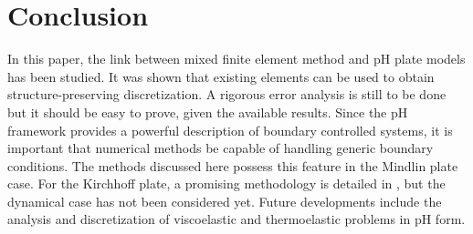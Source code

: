 \section{Conclusion}
In this paper, the link between mixed finite element method and pH plate models has been studied. It was shown that existing elements can be used to obtain structure-preserving discretization. A rigorous error analysis is still to be done but it should be easy to prove, given the available results. Since the pH framework provides a powerful description of boundary controlled systems, it is important that numerical methods be capable of handling generic boundary conditions. The methods discussed here possess this feature in the Mindlin plate case. For the Kirchhoff plate, a promising methodology is detailed in \cite{mixed_kirchhoff}, but the dynamical case has not been considered yet. Future developments include the analysis and discretization of viscoelastic and thermoelastic problems in pH form.
